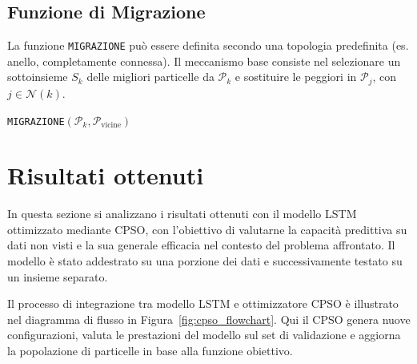 \documentclass{article}
\begin{document}
\subsection{Funzione di Migrazione}

La funzione \texttt{MIGRAZIONE} può essere definita secondo una topologia predefinita 
(es. anello, completamente connessa). Il meccanismo base consiste nel selezionare un sottoinsieme $S_k$ 
delle migliori particelle da $\mathcal{P}_k$ e sostituire le peggiori in $\mathcal{P}_j$, con $j \in \mathcal{N}(k)$.

\begin{algorithm}[H]
\caption{\texttt{MIGRAZIONE}$(\mathcal{P}_k, \mathcal{P}_{\text{vicine}})$}
\end{algorithm}

\section{Risultati ottenuti}

In questa sezione si analizzano i risultati ottenuti con il modello LSTM 
ottimizzato mediante CPSO, con l’obiettivo di valutarne la capacità predittiva 
su dati non visti e la sua generale efficacia nel contesto del problema affrontato. 
Il modello è stato addestrato su una porzione dei dati e successivamente testato 
su un insieme separato.

Il processo di integrazione tra modello LSTM e ottimizzatore CPSO è illustrato nel diagramma di flusso 
in Figura~\ref{fig:cpso_flowchart}. Qui il CPSO genera nuove configurazioni, valuta 
le prestazioni del modello sul set di validazione e aggiorna la popolazione di particelle 
in base alla funzione obiettivo.
\end{document}
